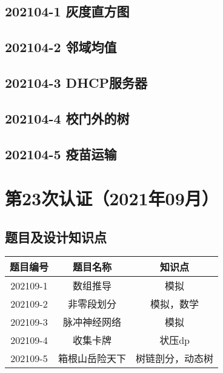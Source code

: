\documentclass[cn,10pt,math=newtx,citestyle=gb7714-2015,bibstyle=gb7714-2015]{elegantbook}
\newif\ifonlyanalyze %
\begin{document}
\newpage
\section{202104-1 灰度直方图}
\ifonlyanalyze
\else
  
\fi


\newpage
\section{202104-2 邻域均值}
\ifonlyanalyze
\else
  
\fi


\newpage
\section{202104-3 DHCP服务器}
\ifonlyanalyze
\else
  
\fi


\newpage
\section{202104-4 校门外的树}
\ifonlyanalyze
\else
  
\fi


\newpage
\section{202104-5 疫苗运输}
\ifonlyanalyze
\else
  
\fi



\chapter{第23次认证（2021年09月）}

\section{题目及设计知识点}

\begin{table}[htbp]
  \centering
  \begin{tabular}{ccc}
    \toprule
    题目编号 & 题目名称       & 知识点           \\
    \midrule
    202109-1 & 数组推导       & 模拟             \\
    202109-2 & 非零段划分     & 模拟，数学       \\
    202109-3 & 脉冲神经网络   & 模拟             \\
    202109-4 & 收集卡牌       & 状压dp           \\
    202109-5 & 箱根山岳险天下 & 树链剖分，动态树 \\
    \bottomrule
  \end{tabular}
\end{table}
\end{document}
